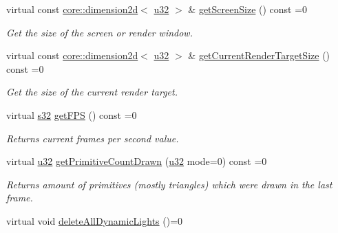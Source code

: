 \begin{DoxyCompactItemize}
virtual const \hyperlink{classirr_1_1core_1_1dimension2d}{core\+::dimension2d}$<$ \hyperlink{namespaceirr_a0416a53257075833e7002efd0a18e804}{u32} $>$ \& \hyperlink{classirr_1_1video_1_1IVideoDriver_a8c072ecaab1a2786a3feaf274fbb99b6}{get\+Screen\+Size} () const  =0
\begin{DoxyCompactList}\small\item\em Get the size of the screen or render window. \end{DoxyCompactList}\item 
virtual const \hyperlink{classirr_1_1core_1_1dimension2d}{core\+::dimension2d}$<$ \hyperlink{namespaceirr_a0416a53257075833e7002efd0a18e804}{u32} $>$ \& \hyperlink{classirr_1_1video_1_1IVideoDriver_a38c665baaf25dcfd510dd3413455af4c}{get\+Current\+Render\+Target\+Size} () const  =0
\begin{DoxyCompactList}\small\item\em Get the size of the current render target. \end{DoxyCompactList}\item 
virtual \hyperlink{namespaceirr_ac66849b7a6ed16e30ebede579f9b47c6}{s32} \hyperlink{classirr_1_1video_1_1IVideoDriver_a2fd9d69e9fb01719b8bcff7a463929a8}{get\+F\+PS} () const  =0
\begin{DoxyCompactList}\small\item\em Returns current frames per second value. \end{DoxyCompactList}\item 
virtual \hyperlink{namespaceirr_a0416a53257075833e7002efd0a18e804}{u32} \hyperlink{classirr_1_1video_1_1IVideoDriver_a29e046d6b90563100a2f2b0b06294c7d}{get\+Primitive\+Count\+Drawn} (\hyperlink{namespaceirr_a0416a53257075833e7002efd0a18e804}{u32} mode=0) const  =0
\begin{DoxyCompactList}\small\item\em Returns amount of primitives (mostly triangles) which were drawn in the last frame. \end{DoxyCompactList}\item 
virtual void \hyperlink{classirr_1_1video_1_1IVideoDriver_ab1bd29567ef6eb31a43bebe04c47eb5e}{delete\+All\+Dynamic\+Lights} ()=0\hypertarget{classirr_1_1video_1_1IVideoDriver_ab1bd29567ef6eb31a43bebe04c47eb5e}{}\label{classirr_1_1video_1_1IVideoDriver_ab1bd29567ef6eb31a43bebe04c47eb5e}


\end{DoxyCompactItemize}
